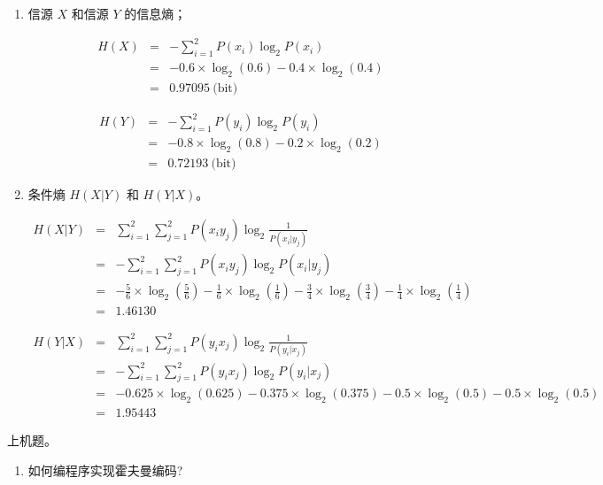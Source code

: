 \documentclass[onecolumn,oneside]{BUPTHomework}
\begin{document}
\begin{solution}
{\begin{enumerate}
      \item 信源 $X$ 和信源 $Y$ 的信息熵；
      
      \begin{eqnarray}
        H(X) &=& - \sum_{i=1}^2P(x_i)\log_2 P(x_i) \nonumber \\
        &=& -0.6 \times \log_2(0.6) - 0.4 \times \log_2(0.4) \nonumber \\
        &=& 0.97095\ \mbox{(bit)}
      \end{eqnarray}

      \begin{eqnarray}
        H(Y) &=& - \sum_{i=1}^2P(y_i)\log_2 P(y_i) \nonumber \\
        &=& -0.8 \times \log_2(0.8) - 0.2 \times \log_2(0.2) \nonumber \\
        &=& 0.72193\ \mbox{(bit)}
      \end{eqnarray}
      
      \item 条件熵 $H(X \vert Y)$ 和 $H(Y \vert X)$。
      
      \begin{eqnarray}
        H(X \vert Y) &=& \sum_{i=1}^2\sum_{j=1}^2P(x_iy_j)\log_2 \frac{1}{P(x_i\vert y_j)} \nonumber \\
        &=& -\sum_{i=1}^2\sum_{j=1}^2P(x_iy_j)\log_2 P(x_i\vert y_j) \nonumber \\
        &=& -\frac{5}{6} \times \log_2(\frac{5}{6}) -\frac{1}{6} \times \log_2(\frac{1}{6}) -\frac{3}{4} \times \log_2(\frac{3}{4}) -\frac{1}{4} \times \log_2(\frac{1}{4}) \nonumber \\
        &=& 1.46130 \nonumber 
      \end{eqnarray}

      \begin{eqnarray}
        H(Y \vert X) &=& \sum_{i=1}^2\sum_{j=1}^2P(y_ix_j)\log_2 \frac{1}{P(y_i\vert x_j)} \nonumber \\
        &=& -\sum_{i=1}^2\sum_{j=1}^2P(y_ix_j)\log_2 P(y_i\vert x_j) \nonumber \\
        &=& -0.625 \times \log_2(0.625) -0.375 \times \log_2(0.375) -0.5 \times \log_2(0.5) -0.5 \times \log_2(0.5) \nonumber \\
        &=& 1.95443 \nonumber 
      \end{eqnarray}
      
    \end{enumerate}
  }
  \end{solution}

  \begin{problem}[19]
  {
    上机题。
    \begin{enumerate}
      \item 如何编程序实现霍夫曼编码?
    \end{enumerate}
  }
  \end{problem}
\end{document}
